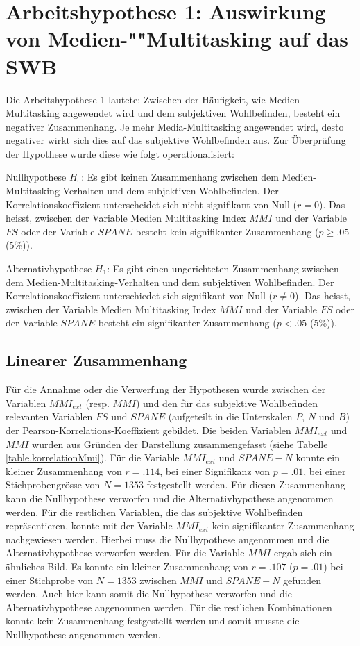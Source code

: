 \section{Arbeitshypothese 1: Auswirkung von Medien-""Multitasking auf das SWB}\label{label.ergebnisse.arbeitshypothese1}
Die Arbeitshypothese 1 lautete: Zwischen der Häufigkeit, wie Medien-Multitasking angewendet wird und dem subjektiven Wohlbefinden, besteht ein negativer Zusammenhang. Je mehr Media-Multitasking angewendet wird, desto negativer wirkt sich dies auf das subjektive Wohlbefinden aus. Zur Überprüfung der Hypothese wurde diese wie folgt operationalisiert:
\par
Nullhypothese $H_{0}$: Es gibt keinen Zusammenhang zwischen dem Medien-Multitasking Verhalten und dem subjektiven Wohlbefinden. Der Korrelationskoeffizient unterscheidet sich nicht signifikant von Null ($r=0$). Das heisst, zwischen der Variable Medien Multitasking Index $MMI$ und der Variable $FS$ oder der Variable $SPANE$  besteht kein signifikanter Zusammenhang ($p \geq .05$ (5\%)).
\par
Alternativhypothese $H_{1}$: Es gibt einen ungerichteten Zusammenhang zwischen dem Medien-Multitasking-Verhalten und dem subjektiven Wohlbefinden. Der Korrelationskoeffizient unterschiedet sich signifikant von Null ($r \neq 0$). Das heisst, zwischen der Variable Medien Multitasking Index $MMI$ und der Variable $FS$ oder der Variable $SPANE$ besteht ein signifikanter Zusammenhang ($p < .05$ (5\%)).

\subsection{Linearer Zusammenhang}
Für die Annahme oder die Verwerfung der Hypothesen wurde zwischen der Variablen $MMI_{ext}$ (resp. $MMI$) und den für das subjektive Wohlbefinden relevanten Variablen $FS$ und $SPANE$ (aufgeteilt in die Unterskalen $P$, $N$ und $B$) der Pearson-Korrelations-Koeffizient gebildet. Die beiden Variablen $MMI_{ext}$ und $MMI$ wurden aus Gründen der Darstellung zusammengefasst (siehe Tabelle \ref{table.korrelationMmi}). Für die Variable $MMI_{ext}$ und $SPANE-N$ konnte ein kleiner Zusammenhang von $r=.114$, bei einer Signifikanz von $p=.01$, bei einer Stichprobengrösse von $N=1353$ festgestellt werden. Für diesen Zusammenhang kann die Nullhypothese verworfen und die Alternativhypothese angenommen werden. Für die restlichen Variablen, die das subjektive Wohlbefinden repräsentieren, konnte mit der Variable $MMI_{ext}$ kein signifikanter Zusammenhang nachgewiesen werden. Hierbei muss die Nullhypothese angenommen und die Alternativhypothese verworfen werden. Für die Variable $MMI$ ergab sich ein ähnliches Bild. Es konnte ein kleiner Zusammenhang von $r=.107$ ($p=.01$) bei einer Stichprobe von $N=1353$ zwischen $MMI$ und $SPANE-N$ gefunden werden. Auch hier kann somit die Nullhypothese verworfen und die Alternativhypothese angenommen werden. Für die restlichen Kombinationen konnte kein Zusammenhang festgestellt werden und somit musste die Nullhypothese angenommen werden.

